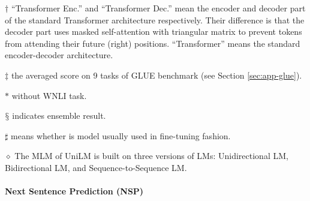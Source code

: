 \documentclass[fleqn]{SCYE-arxiv}
\begin{document}
\begin{multicols}{2}
\begin{table*}[t]
\begin{threeparttable}
\begin{tablenotes}
\item[$\dagger$] ``Transformer Enc.'' and ``Transformer Dec.'' mean the encoder and decoder part of the standard Transformer architecture respectively. Their difference is that the decoder part uses masked self-attention with triangular matrix to prevent tokens from attending their future (right) positions. ``Transformer'' means the standard encoder-decoder architecture.
\item[$\ddagger$] the averaged score on 9 tasks of GLUE benchmark (see Section \ref{sec:app-glue}).
\item[$*$] without WNLI task.
\item[$\mathsection$] indicates ensemble result.
\item[$\sharp$] means whether is model usually used in fine-tuning fashion.
 \item[$\diamond$] The MLM of UniLM is built on three versions of LMs: Unidirectional LM, Bidirectional LM,  and Sequence-to-Sequence LM.
\end{tablenotes}
 \end{threeparttable}
 \end{table*}

\paragraph{Next Sentence Prediction (NSP)}


\end{multicols}
\end{document}
